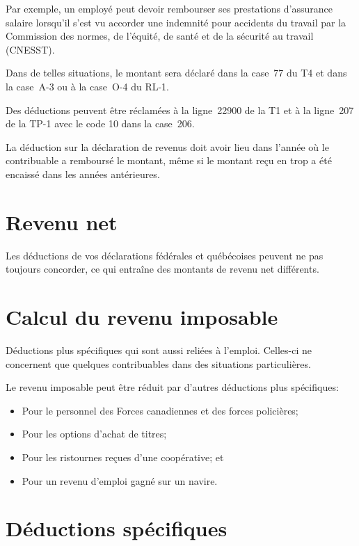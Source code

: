 Par exemple, un employé peut devoir rembourser ses prestations d'assurance salaire lorsqu'il s'est vu accorder une indemnité pour accidents du travail par la Commission des normes, de l'équité, de santé et de la sécurité au travail (CNESST).

Dans de telles situations, le montant sera déclaré dans la case~77 du T4 et dans la case~A-3 ou à la case~O-4 du RL-1.

Des déductions peuvent être réclamées à la ligne~22900 de la T1 et à la ligne~207 de la TP-1 avec le code 10 dans la case~206.

La déduction sur la déclaration de revenus doit avoir lieu dans l'année où le contribuable a remboursé le montant, même si le montant reçu en trop a été encaissé dans les années antérieures.



\section{Revenu net}
Les déductions de vos déclarations fédérales et québécoises peuvent ne pas toujours concorder, ce qui entraîne des montants de revenu net différents.



\section{Calcul du revenu imposable}
\begin{intro}
	Déductions plus spécifiques qui sont aussi reliées à l'emploi. Celles-ci ne concernent que quelques contribuables dans des situations particulières.
\end{intro}

Le revenu imposable peut être réduit par d'autres déductions plus spécifiques:
\begin{itemize}
	\item Pour le personnel des Forces canadiennes et des forces policières;
	\item Pour les options d'achat de titres;
	\item Pour les ristournes reçues d'une coopérative; et
	\item Pour un revenu d'emploi gagné sur un navire.
\end{itemize}



\section{Déductions spécifiques}
